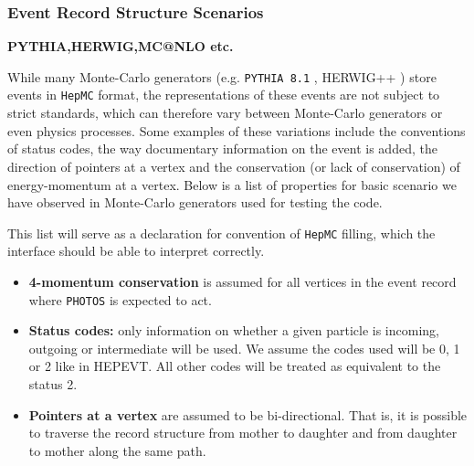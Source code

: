 \documentclass[]{Photos_interface_design}
\begin{document}
\subsubsection{Event Record Structure Scenarios}

{\bf PYTHIA,HERWIG,MC@NLO etc. }

While many Monte-Carlo generators (e.g. {\tt PYTHIA 8.1} \cite{Sjostrand:2007gs}, 
HERWIG++ \cite{Bahr:2008pv})
store events in {\tt HepMC} format, the  representations of
these events are not subject to strict standards,  which can therefore
vary between Monte-Carlo generators or even physics processes. Some examples
of these variations include the conventions of status codes, the  way
documentary information on the event is added, the direction of pointers at a vertex
and the conservation (or lack of conservation) of energy-momentum at a vertex.
Below is a list of properties for basic scenario we have observed in Monte-Carlo
generators used for testing the code.

This list will serve as a declaration for convention of  {\tt HepMC} filling, which  the 
interface should  be able to interpret correctly.

\begin{itemize}
  \item \textbf{4-momentum conservation} is assumed for all vertices in the event record where {\tt PHOTOS} is expected to act.
  \item \textbf{Status codes:} only information on whether a given particle is incoming, outgoing or intermediate will be used. We assume the codes used will be 0, 1 or 2 like in HEPEVT. All other codes will be treated as
equivalent to  the status 2.
  \item \textbf{Pointers at a vertex} are assumed to be bi-directional. That is, it is possible to traverse the record structure from mother to daughter and from daughter to mother along the same path.
\end{itemize}
\end{document}
